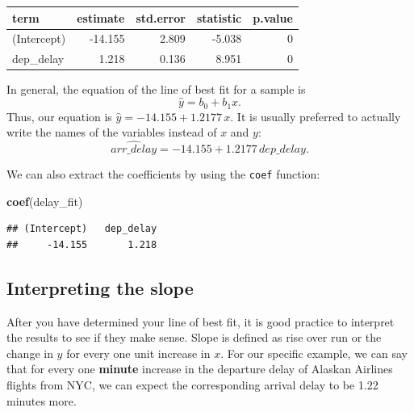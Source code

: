 \documentclass[]{tufte-book}
\newenvironment{Shaded}{\begin{snugshade}}{\end{snugshade}}
\newcommand{\KeywordTok}[1]{\textcolor[rgb]{0.13,0.29,0.53}{\textbf{{#1}}}}
\newcommand{\DataTypeTok}[1]{\textcolor[rgb]{0.13,0.29,0.53}{{#1}}}
\newcommand{\StringTok}[1]{\textcolor[rgb]{0.31,0.60,0.02}{{#1}}}
\newcommand{\NormalTok}[1]{{#1}}
\begin{document}
\begin{Shaded}
\end{Shaded}

\begin{tabular}{l|r|r|r|r}
\hline
term & estimate & std.error & statistic & p.value\\
\hline
(Intercept) & -14.155 & 2.809 & -5.038 & 0\\
\hline
dep\_delay & 1.218 & 0.136 & 8.951 & 0\\
\hline
\end{tabular}

In general, the equation of the line of best fit for a sample is
\[\hat{y} = b_0 + b_1 x.\] Thus, our equation is
\(\hat{y} = -14.155 + 1.2177 \, x.\) It is usually preferred to actually
write the names of the variables instead of \(x\) and \(y\):
\[\widehat{arr\_delay} = -14.155 + 1.2177 \, dep\_delay.\]

We can also extract the coefficients by using the \texttt{coef}
function:

\begin{Shaded}
\begin{Highlighting}[]
\KeywordTok{coef}\NormalTok{(delay_fit)}
\end{Highlighting}
\end{Shaded}

\begin{verbatim}
## (Intercept)   dep_delay 
##     -14.155       1.218
\end{verbatim}

\subsection{Interpreting the slope}\label{interpreting-the-slope}

After you have determined your line of best fit, it is good practice to
interpret the results to see if they make sense. Slope is defined as
rise over run or the change in \(y\) for every one unit increase in
\(x\). For our specific example, we can say that for every one
\textbf{minute} increase in the departure delay of Alaskan Airlines
flights from NYC, we can expect the corresponding arrival delay to be
1.22 minutes more.
\end{document}
